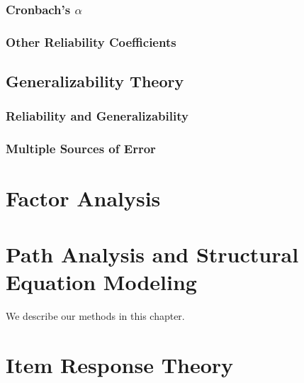 \documentclass[
]{book}
\begin{document}
\hypertarget{cronbachs-alpha}{%
\subsection{\texorpdfstring{Cronbach's \(\alpha\)}{Cronbach's \textbackslash alpha}}\label{cronbachs-alpha}}

\hypertarget{other-reliability-coefficients}{%
\subsection{Other Reliability Coefficients}\label{other-reliability-coefficients}}

\hypertarget{generalizability-theory}{%
\section{Generalizability Theory}\label{generalizability-theory}}

\hypertarget{reliability-and-generalizability}{%
\subsection{Reliability and Generalizability}\label{reliability-and-generalizability}}

\hypertarget{multiple-sources-of-error}{%
\subsection{Multiple Sources of Error}\label{multiple-sources-of-error}}

\hypertarget{factor-analysis}{%
\chapter{Factor Analysis}\label{factor-analysis}}

\hypertarget{path-analysis-and-structural-equation-modeling}{%
\chapter{Path Analysis and Structural Equation Modeling}\label{path-analysis-and-structural-equation-modeling}}

We describe our methods in this chapter.

\hypertarget{item-response-theory}{%
\chapter{Item Response Theory}\label{item-response-theory}}
\end{document}
